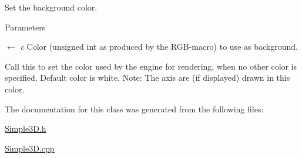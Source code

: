 Set the background color. 


\begin{DoxyParams}{Parameters}
\item[\mbox{$\leftarrow$} {\em c}]Color (unsigned int as produced by the RGB-\/macro) to use as background.\end{DoxyParams}
Call this to set the color used by the engine for rendering, when no other color is specified. Default color is white. Note: The axis are (if displayed) drawn in this color. 

The documentation for this class was generated from the following files:\begin{DoxyCompactItemize}
\item 
\hyperlink{_simple3_d_8h}{Simple3D.h}\item 
\hyperlink{_simple3_d_8cpp}{Simple3D.cpp}\end{DoxyCompactItemize}
